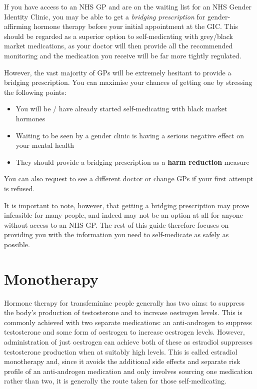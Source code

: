 \documentclass[twoside,a5paper]{article}
\begin{document}
If you have access to an NHS GP and are on the waiting list for an NHS
Gender Identity Clinic, you may be able to get a \textit{bridging
  prescription} for gender-affirming hormone therapy before your
initial appointment at the GIC.  This should be regarded as a superior
option to self-medicating with grey/black market medications, as your
doctor will then provide all the recommended monitoring and the
medication you receive will be far more tightly regulated.

However, the vast majority of GPs will be extremely hesitant to
provide a bridging prescription.  You can maximise your chances of
getting one by stressing the following points:

\begin{itemize}
\item You will be / have already started self-medicating with black
  market hormones
\item Waiting to be seen by a gender clinic is having a serious
  negative effect on your mental health
\item They should provide a bridging prescription as a \textbf{harm
    reduction} measure
\end{itemize}

You can also request to see a different doctor or change GPs if your
first attempt is refused.

It is important to note, however, that getting a bridging prescription
may prove infeasible for many people, and indeed may not be an option
at all for anyone without access to an NHS GP.  The rest of this guide
therefore focuses on providing you with the information you need to
self-medicate as safely as possible.

\section{Monotherapy}

Hormone therapy for transfeminine people generally has two aims: to
suppress the body's production of testosterone and to increase
oestrogen levels.  This is commonly achieved with two separate
medications: an anti-androgen to suppress testosterone and some form
of oestrogen to increase oestrogen levels.  However, administration of
just oestrogen can achieve both of these as estradiol suppresses
testosterone production when at suitably high levels.  This is called
estradiol monotherapy and, since it avoids the additional side effects
and separate risk profile of an anti-androgen medication and only
involves sourcing one medication rather than two, it is generally the
route taken for those self-medicating.
\end{document}
